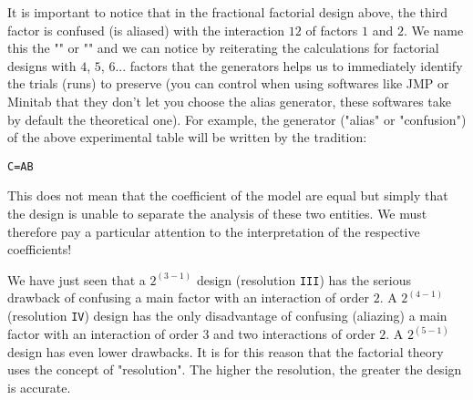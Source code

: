 	It is important to notice that in the fractional factorial design above, the third factor is confused (is aliased) with the interaction $12$ of factors $1$ and $2$. We name this the "" or "" and we can notice by reiterating the calculations for factorial designs with $4$, $5$, $6$... factors that the generators helps us to immediately identify the trials (runs) to preserve (you can control when using softwares like JMP or Minitab that they don't let you choose the alias generator, these softwares take by default the theoretical one). For example, the generator ("alias" or "confusion") of the above experimental table will be written by the tradition:
	
	\begin{center}
	\texttt{C=AB}
	\end{center}
	
	This does not mean that the coefficient of the model are equal but simply that the design is unable to separate the analysis of these two entities. We must therefore pay a particular attention to the interpretation of the respective coefficients!
	
	We have just seen that a $2^{(3-1)}$ design (resolution \texttt{III}) has the serious drawback of confusing a main factor with an interaction of order $2$. A $2^{(4-1)}$ (resolution \texttt{IV}) design has the only disadvantage of confusing (aliazing) a main factor with an interaction of order $3$ and two interactions of order $2$. A $2^{(5-1)}$ design has even lower drawbacks. It is for this reason that the factorial theory uses the concept of "resolution". The higher the resolution, the greater the design is accurate.
	
